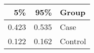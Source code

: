 \begin{table}[ht]
\centering
\begin{tabular}{rrl}
  \hline
5\% & 95\% & Group \\ 
  \hline
0.423 & 0.535 & Case \\ 
  0.122 & 0.162 & Control \\ 
   \hline
\end{tabular}
\end{table}
